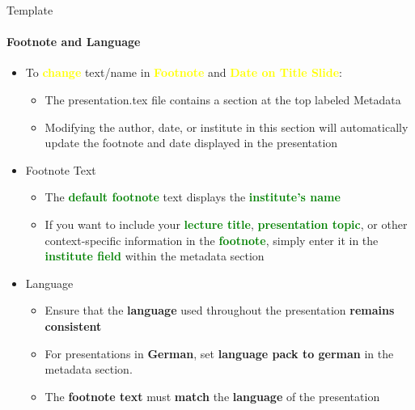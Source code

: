 \documentclass[aspectratio=169]{beamer}
\begin{document}
\begin{frame}{Template}
    \framesubtitle{Footnote and Language}

    
    \begin{minipage}{0.8\textwidth}  %
        \begin{itemize}
            \item To \textcolor{yellow}{\textbf{change}} text/name in \textcolor{yellow}{\textbf{Footnote}} and \textcolor{yellow}{\textbf{Date on Title Slide}}: 
            \vspace{-0.5\topsep}
            \begin{itemize}
                \item The presentation.tex file contains a section at the top labeled Metadata
                \item Modifying the author, date, or institute in this section will automatically update the footnote and date displayed in the presentation
            \end{itemize}
    
            \item Footnote Text
            \vspace{-0.5\topsep}
            \begin{itemize}
                \item The \textcolor{green}{\textbf{default footnote}} text displays the \textcolor{green}{\textbf{institute's name}}
                \item If you want to include your \textcolor{green}{\textbf{lecture title}}, \textcolor{green}{\textbf{presentation topic}}, or other context-specific information in the \textcolor{green}{\textbf{footnote}}, simply enter it in the \textcolor{green}{\textbf{institute field}} within the metadata section
            \end{itemize}
            
            \item Language
            \vspace{-0.5\topsep}
            \begin{itemize}
                \item Ensure that the \textcolor{iee}{\textbf{language}} used throughout the presentation \textcolor{iee}{\textbf{remains consistent}}
                \item For presentations in \textcolor{iee}{\textbf{German}}, set \textcolor{iee}{\textbf{language pack to german}} in the metadata section.
                \item The \textcolor{iee}{\textbf{footnote text}} must \textcolor{iee}{\textbf{match}} the \textcolor{iee}{\textbf{language}} of the presentation
            \end{itemize}
        \end{itemize}
    \end{minipage}
\end{frame}
\end{document}
